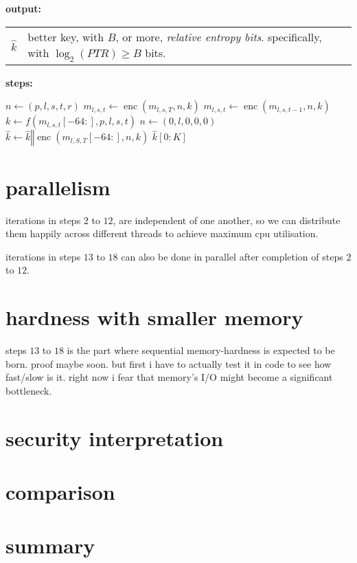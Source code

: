 \documentclass{article}
\DeclareMathOperator{\enc}{enc}
\DeclareMathOperator{\len}{len}
\begin{document}
\begin{multicols}{2}
\noindent\textbf{output:}

\begin{tabular}{lp{18em}}
$\hat k$ & better key, with $B$, or more, \emph{relative entropy bits}.
specifically, with $\log_2(PTR) \ge B$ bits.\\
\end{tabular}

\noindent\textbf{steps:}

\begin{algorithmic}[1]
                        \STATE $n \gets (p, l, s, t, r)$
                            \STATE $m_{l,s,t} \gets \enc(m_{l,s,T}, n, k)$
                        \ELSE
                            \STATE $m_{l,s,t} \gets \enc(m_{l,s,t-1}, n, k)$
                        \ENDIF
                        \STATE $k \gets f(m_{l,s,t}[-64:], p, l, s, t)$
                    \ENDFOR
                \ENDFOR
            \ENDFOR
        \ENDFOR
    \ENDFOR
            \STATE $n \gets (0, l, 0, 0, 0)$
            \STATE $\hat k \gets \hat k \mathbin\Vert \enc(m_{l,S,T}[-64:], n, k)$
            \IF{$\len(\hat k) \ge K$}
                \RETURN $\hat k[0:K]$
            \ENDIF
        \ENDFOR
    \ENDWHILE
\end{algorithmic}
\vfill\null
\columnbreak

\section{parallelism}
iterations in steps $2$ to $12$, are independent of one another, so we can
distribute them happily across different threads to achieve maximum cpu
utilisation.

iterations in steps $13$ to $18$ can also be done in parallel after
completion of steps $2$ to $12$.

\section{hardness with smaller memory}
steps $13$ to $18$ is the part where sequential memory-hardness is expected
to be born.  proof maybe soon.  but first i have to actually test it in
code to see how fast/slow is it.  right now i fear that memory's I/O might
become a significant bottleneck.
\vfill\null
\columnbreak

\section{security interpretation}
\section{comparison}
\section{summary}

\end{multicols}
\end{document}
